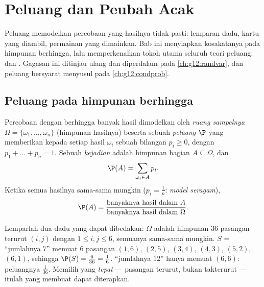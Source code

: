 \chapter{Peluang dan Peubah Acak}\label{ch:g11:prob}

Peluang memodelkan percobaan yang hasilnya tidak pasti: lemparan dadu, kartu
yang diambil, permainan yang dimainkan. Bab ini menyiapkan kosakatanya pada
himpunan berhingga, lalu memperkenalkan tokoh utama seluruh teori peluang:
\emph{} dan \emph{}. Gagasan ini ditinjau
ulang dan diperdalam pada \cref{ch:g12:randvar}, dan peluang bersyarat
menyusul pada \cref{ch:g12:condprob}.

\section{Peluang pada himpunan berhingga}

\begin{definition}\label{def:g11:prob:model}
Percobaan dengan berhingga banyak hasil dimodelkan oleh \emph{ruang
sampelnya} $\Omega = \{\omega_1, \dots, \omega_n\}$
(himpunan hasilnya) beserta sebuah \emph{peluang} $\P$ yang memberikan kepada
setiap hasil $\omega_i$ sebuah bilangan $p_i \geq 0$, dengan
$p_1 + \dots + p_n = 1$. Sebuah \emph{kejadian} adalah
himpunan bagian $A \subseteq \Omega$, dan
\[
\P(A) = \sum_{\omega_i \in A} p_i .
\]
Ketika semua hasilnya sama-sama mungkin ($p_i = \frac1n$: \emph{model
seragam}),
\[
\P(A) = \frac{\text{banyaknya hasil dalam } A}
{\text{banyaknya hasil dalam } \Omega}.
\]
\end{definition}

\begin{example}\label{ex:g11:prob:twodice}
Lemparlah dua dadu yang dapat dibedakan: $\Omega$ adalah himpunan $36$ pasangan
terurut $(i, j)$ dengan $1 \leq i, j \leq 6$, semuanya sama-sama mungkin.
 $S$ = ``jumlahnya $7$'' memuat $6$ pasangan
$(1,6)$, $(2,5)$, $(3,4)$, $(4,3)$, $(5,2)$, $(6,1)$, sehingga
$\P(S) = \frac{6}{36} = \frac16$.  ``jumlahnya $12$'' hanya memuat
$(6,6)$: peluangnya $\frac{1}{36}$. Memilih  yang \emph{tepat} ---
pasangan terurut, bukan takterurut --- itulah yang membuat  dapat diterapkan.
\end{example}

